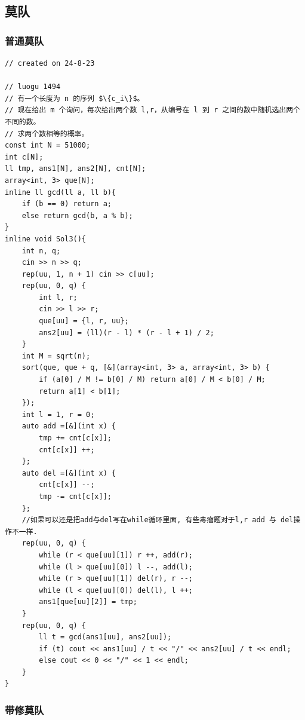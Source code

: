 \documentclass[a4paper,12pt]{article}
\begin{document}
\begin{lstlisting}
\end{lstlisting}

\subsection{莫队}

\subsubsection{普通莫队}

\begin{lstlisting}
// created on 24-8-23

// luogu 1494
// 有一个长度为 n 的序列 $\{c_i\}$。
// 现在给出 m 个询问，每次给出两个数 l,r，从编号在 l 到 r 之间的数中随机选出两个不同的数。
// 求两个数相等的概率。
const int N = 51000;
int c[N];
ll tmp, ans1[N], ans2[N], cnt[N];
array<int, 3> que[N];
inline ll gcd(ll a, ll b){
    if (b == 0) return a;
    else return gcd(b, a % b);
}
inline void Sol3(){
    int n, q;
    cin >> n >> q;
    rep(uu, 1, n + 1) cin >> c[uu];
    rep(uu, 0, q) {
        int l, r;
        cin >> l >> r;
        que[uu] = {l, r, uu};
        ans2[uu] = (ll)(r - l) * (r - l + 1) / 2;
    }
    int M = sqrt(n);
    sort(que, que + q, [&](array<int, 3> a, array<int, 3> b) {
        if (a[0] / M != b[0] / M) return a[0] / M < b[0] / M;
        return a[1] < b[1];
    });
    int l = 1, r = 0;
    auto add =[&](int x) {
        tmp += cnt[c[x]];
        cnt[c[x]] ++;
    };
    auto del =[&](int x) {
        cnt[c[x]] --;
        tmp -= cnt[c[x]];
    };
    //如果可以还是把add与del写在while循环里面, 有些毒瘤题对于l,r add 与 del操作不一样.
    rep(uu, 0, q) {
        while (r < que[uu][1]) r ++, add(r);
        while (l > que[uu][0]) l --, add(l);
        while (r > que[uu][1]) del(r), r --;
        while (l < que[uu][0]) del(l), l ++;
        ans1[que[uu][2]] = tmp;
    }
    rep(uu, 0, q) {
        ll t = gcd(ans1[uu], ans2[uu]);
        if (t) cout << ans1[uu] / t << "/" << ans2[uu] / t << endl;
        else cout << 0 << "/" << 1 << endl;
    }
}
\end{lstlisting}

\subsubsection{带修莫队}
\end{document}
